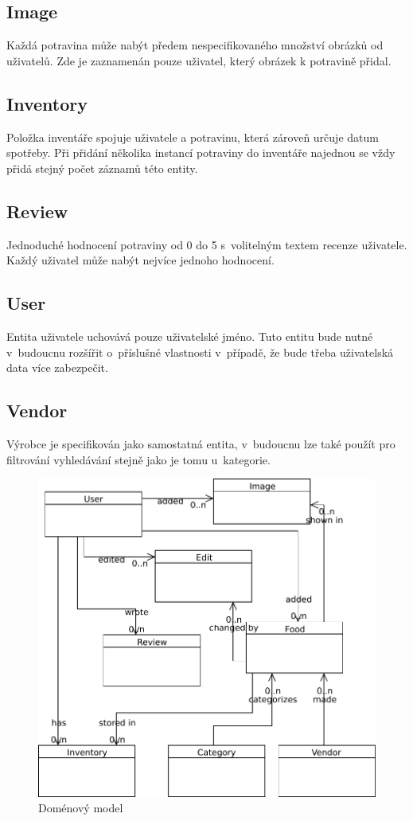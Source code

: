 \documentclass[thesis=B,czech]{FITthesis}[2013/10/20]
\begin{document}
\subsection{Image}
Každá potravina může nabýt předem nespecifikovaného množství obrázků od uživatelů. Zde je zaznamenán pouze uživatel, který obrázek k potravině přidal.

\subsection{Inventory}
Položka inventáře spojuje uživatele a potravinu, která zároveň určuje datum spotřeby. Při přidání několika instancí potraviny do inventáře najednou se vždy přidá stejný počet záznamů této entity.

\subsection{Review}
Jednoduché hodnocení potraviny od 0 do 5 s~volitelným textem recenze uživatele. Každý uživatel může nabýt nejvíce jednoho hodnocení.

\subsection{User}
Entita uživatele uchovává pouze uživatelské jméno. Tuto entitu bude nutné v~budoucnu rozšířit o~příslušné vlastnosti v~případě, že bude třeba uživatelská data více zabezpečit.

\subsection{Vendor}
Výrobce je specifikován jako samostatná entita, v~budoucnu lze také použít pro filtrování vyhledávání stejně jako je tomu u~kategorie.

\begin{figure}[H]
  \centering
  \includegraphics[scale=0.75]{diagrams/model}
  \caption{Doménový model}
  \label{fig:DomainModel}
\end{figure}
\end{document}
